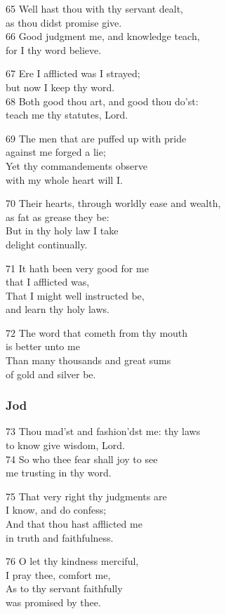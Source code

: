 65 Well hast thou with thy servant dealt,\\
as thou didst promise give.\\
66 Good judgment me, and knowledge teach,\\
for I thy word believe.

67 Ere I afflicted was I strayed;\\
but now I keep thy word.\\
68 Both good thou art, and good thou do’st:\\
teach me thy statutes, Lord.

69 The men that are puffed up with pride\\
against me forged a lie;\\
Yet thy commandements observe\\
with my whole heart will I.

70 Their hearts, through worldly ease and wealth,\\
as fat as grease they be:\\
But in thy holy law I take\\
delight continually.

71 It hath been very good for me\\
that I afflicted was,\\
That I might well instructed be,\\
and learn thy holy laws.

72 The word that cometh from thy mouth\\
is better unto me\\
Than many thousands and great sums\\
of gold and silver be.

\subsubsection*{Jod}

73 Thou mad’st and fashion’dst me: thy laws\\
to know give wisdom, Lord.\\
74 So who thee fear shall joy to see\\
me trusting in thy word.

75 That very right thy judgments are\\
I know, and do confess;\\
And that thou hast afflicted me\\
in truth and faithfulness.

76 O let thy kindness merciful,\\
I pray thee, comfort me,\\
As to thy servant faithfully\\
was promised by thee.

